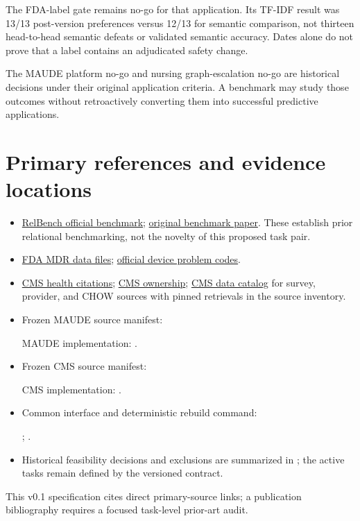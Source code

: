 \documentclass[11pt,a4paper]{article}
\begin{document}
The FDA-label gate remains no-go for that application. Its TF-IDF result was 13/13 post-version preferences versus 12/13 for semantic comparison, not thirteen head-to-head semantic defeats or validated semantic accuracy. Dates alone do not prove that a label contains an adjudicated safety change.

The MAUDE platform no-go and nursing graph-escalation no-go are historical decisions under their original application criteria. A benchmark may study those outcomes without retroactively converting them into successful predictive applications.

\section{Primary references and evidence locations}
\begin{itemize}
\item \href{https://relbench.stanford.edu/}{RelBench official benchmark}; \href{https://arxiv.org/abs/2407.20060}{original benchmark paper}. These establish prior relational benchmarking, not the novelty of this proposed task pair.
\item \href{https://www.fda.gov/medical-devices/medical-device-reporting-mdr-how-report-medical-device-problems/mdr-data-files}{FDA MDR data files}; \href{https://www.accessdata.fda.gov/MAUDE/ftparea/deviceproblemcodes2025.zip}{official device problem codes}.
\item \href{https://data.cms.gov/provider-data/dataset/r5ix-sfxw}{CMS health citations}; \href{https://data.cms.gov/provider-data/dataset/y2hd-n93e}{CMS ownership}; \href{https://data.cms.gov/}{CMS data catalog} for survey, provider, and CHOW sources with pinned retrievals in the source inventory.
\item Frozen MAUDE source manifest:\par
{}\par
MAUDE implementation: .
\item Frozen CMS source manifest:\par
{}\par
CMS implementation: .
\item Common interface and deterministic rebuild command:\par
{}; .
\item Historical feasibility decisions and exclusions are summarized in ; the active tasks remain defined by the versioned contract.
\end{itemize}
This v0.1 specification cites direct primary-source links; a publication bibliography requires a focused task-level prior-art audit.
\end{document}
